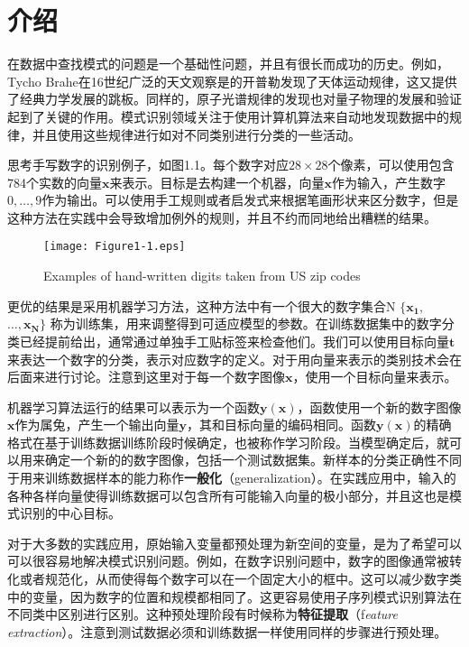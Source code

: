\chapter{介绍}
	在数据中查找模式的问题是一个基础性问题，并且有很长而成功的历史。例如，Tycho Brahe在16世纪广泛的天文观察是的开普勒发现了天体运动规律，这又提供了经典力学发展的跳板。同样的，原子光谱规律的发现也对量子物理的发展和验证起到了关键的作用。模式识别领域关注于使用计算机算法来自动地发现数据中的规律，并且使用这些规律进行如对不同类别进行分类的一些活动。
	
	思考手写数字的识别例子，如图1.1。每个数字对应$28 \times 28$个像素，可以使用包含784个实数的向量$\mathbf{x}$来表示。目标是去构建一个机器，向量$\mathbf{x}$作为输入，产生数字$0,\dots, 9$作为输出。可以使用手工规则或者启发式来根据笔画形状来区分数字，但是这种方法在实践中会导致增加例外的规则，并且不约而同地给出糟糕的结果。
	
\begin{figure}
	\centering
	\texttt{[image: Figure1-1.eps]}
	\caption{Examples of hand-written digits taken from US zip codes} 
	\label{fig:endb-flow} 
\end{figure}

	更优的结果是采用机器学习方法，这种方法中有一个很大的数字集合N $\{ \mathbf{x_1},$ $ \dots, \mathbf{x_N} \}$ 称为训练集，用来调整得到可适应模型的参数。在训练数据集中的数字分类已经提前给出，通常通过单独手工贴标签来检查他们。我们可以使用目标向量$\mathbf{t}$来表达一个数字的分类，表示对应数字的定义。对于用向量来表示的类别技术会在后面来进行讨论。注意到这里对于每一个数字图像$\mathbf{x}$，使用一个目标向量来表示。
	
	机器学习算法运行的结果可以表示为一个函数$\mathbf{y(x)}$，函数使用一个新的数字图像$\mathbf{x}$作为属兔，产生一个输出向量$\mathbf{y}$，其和目标向量的编码相同。函数$\mathbf{y(x)}$的精确格式在基于训练数据训练阶段时候确定，也被称作学习阶段。当模型确定后，就可以用来确定一个新的的数字图像，包括一个测试数据集。新样本的分类正确性不同于用来训练数据样本的能力称作\textbf{一般化}（generalization）。在实践应用中，输入的各种各样向量使得训练数据可以包含所有可能输入向量的极小部分，并且这也是模式识别的中心目标。
	
	对于大多数的实践应用，原始输入变量都预处理为新空间的变量，是为了希望可以可以很容易地解决模式识别问题。例如，在数字识别问题中，数字的图像通常被转化或者规范化，从而使得每个数字可以在一个固定大小的框中。这可以减少数字类中的变量，因为数字的位置和规模都相同了。这更容易使用子序列模式识别算法在不同类中区别进行区别。这种预处理阶段有时候称为\textbf{特征提取}（f\textit{eature extraction}）。注意到测试数据必须和训练数据一样使用同样的步骤进行预处理。
	
